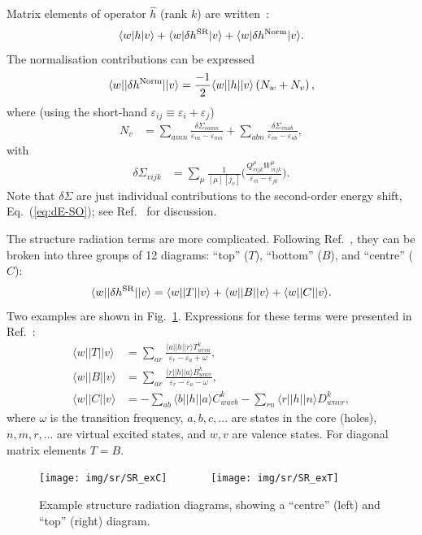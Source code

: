 \documentclass[10pt,twocolumn,a4paper]{article}%
\newcommand{\bra}[1]{\ensuremath{\langle #1|}}	%
\newcommand{\ket}[1]{\ensuremath{|#1\rangle}}	%
\newcommand{\be}{\begin{equation}}
\newcommand{\ee}{\end{equation}}
\def\en{\ensuremath{\varepsilon}}
\newcommand{\w}{\ensuremath{\omega}}
\begin{document}
Matrix elements of operator $\hat h$ (rank $k$) are written~\cite{Blundell1987,Dzuba1987jpbRPA}:
\be
\bra{w}h\ket{v} + \bra{w}\delta h^{\rm SR}\ket{v}+\bra{w}\delta h^{\rm Norm}\ket{v}.
\ee
The normalisation contributions can be expressed
\be
\bra{w}|\delta h^{\rm Norm}|\ket{v} = \frac{-1}{2}\bra{w}|h|\ket{v}\left(N_{w}  +  N_{v}\right),
\ee
where (using the short-hand $\en_{ij}\equiv\en_i+\en_j$)
\begin{align}
N_v &=
 \sum_{amn} \frac{\delta\Sigma_{vamn}}{\en_{va} - \en_{mn}}
+\sum_{abn}\frac{\delta\Sigma_{vnab}}{\en_{vn}-\en_{ab}} ,
\end{align}
with
\begin{align}
\delta\Sigma_{vijk} &=\sum_\mu \frac{1}{[\mu][j_v]}\Bigg(
\frac{Q^\mu_{vijk}W^\mu_{vijk}}{\en_{vi} - \en_{jk}}
 \Bigg).
\end{align}
Note that $\delta\Sigma$ are just individual contributions to the second-order energy shift, Eq.~(\ref{eq:dE-SO});
see Ref.~\cite{Dzuba1987jpbRPA} for discussion.








The structure radiation terms are more complicated.
Following Ref.~\cite{JohLiuSap96}, they can be broken into three groups of 12 diagrams: ``top'' ($T$), ``bottom'' ($B$), and ``centre'' ($C$):
\[
\bra{w}|\delta h^{\rm SR}|\ket{v} = \bra{w}|T|\ket{v} + \bra{w}|B|\ket{v} + \bra{w}|C|\ket{v}.
\]
Two examples are shown in Fig.~\ref{fig:SR-example}.
Expressions for these terms were presented in Ref.~\cite{JohLiuSap96}:
\begin{align}
\bra{w}|T|\ket{v} &= \sum_{ar} \frac{\bra{a}|h|\ket{r} T^k_{wrva}}{\en_r - \en_a + \w},\\
\bra{w}|B|\ket{v} &= \sum_{ar} \frac{\bra{r}|h|\ket{a} B^k_{wavr}}{\en_r - \en_a - \w},\\
\bra{w}|C|\ket{v} &= -\sum_{ab} {\bra{b}|h|\ket{a} C^{k}_{wavb}} - \sum_{rn} {\bra{r}|h|\ket{n} D^{k}_{wnvr}},
\end{align}
where $\omega$ is the transition frequency,
$a,b,c,...$ are states in the core (holes), $n,m,r,...$ are virtual excited states, and $w,v$ are valence states.
For diagonal matrix elements $T=B$.




\begin{figure}%
\centering\tiny
\texttt{[image: img/sr/SR\_exC]}~~~~~~~
\texttt{[image: img/sr/SR\_exT]}
\caption{\small Example structure radiation diagrams, showing a ``centre'' (left) and ``top'' (right) diagram.\label{fig:SR-example}}
\end{figure}
\end{document}
